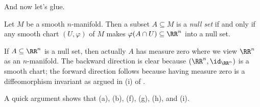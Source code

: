 \documentclass[../notes.tex]{subfiles}
\begin{document}
And now let's glue.
\begin{definition}
	Let $M$ be a smooth $n$-manifold. Then a subset $A\subseteq M$ is a \textit{null set} if and only if any smooth chart $(U,\varphi)$ of $M$ makes $\varphi(A\cap U)\subseteq\RR^n$ into a null set.
\end{definition}
\begin{remark}
	If $A\subseteq\RR^n$ is a null set, then actually $A$ has measure zero where we view $\RR^n$ as an $n$-manifold. The backward direction is clear because $(\RR^n,{\id_{\RR^n}})$ is a smooth chart; the forward direction follows because having measure zero is a diffeomorphism invariant as argued in (i) of .
\end{remark}
\begin{remark}
	A quick argument shows that (a), (b), (f), (g), (h), and (i).
\end{remark}
\end{document}
